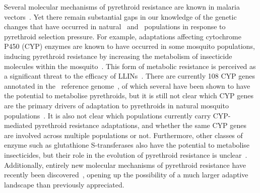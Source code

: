\begin{refsection}
Several molecular mechanisms of pyrethroid resistance are known in malaria vectors~\parencite{Hemingway2016}.
%
Yet there remain substantial gaps in our knowledge of the genetic changes that have occurred in natural \agam\ and \acol\ populations in response to pyrethroid selection pressure.
%
For example, adaptations affecting cytochrome P450 (CYP) enzymes are known to have occurred in some mosquito populations, inducing pyrethroid resistance by increasing the metabolism of insecticide molecules within the mosquito~\parencite{Ranson2016,Hemingway2016}.
%
This form of metabolic resistance is perceived as a significant threat to the efficacy of LLINs~\parencite{Churcher2016,WHO2017PBOLLIN}.
%
There are currently 108 CYP genes annotated in the \agam\ reference genome~\parencite{GiraldoCalderon2015,AgamP4.12}, of which several have been shown to have the potential to metabolise pyrethroids, but it is still not clear which CYP genes are the primary drivers of adaptation to pyrethroids in natural mosquito populations~\parencite{Mohammed2017}.
%
It is also not clear which populations currently carry CYP-mediated pyrethroid resistance adaptations, and whether the same CYP genes are involved across multiple populations or not.
%
Furthermore, other classes of enzyme such as glutathione S-transferases also have the potential to metabolise insecticides, but their role in the evolution of pyrethroid resistance is unclear~\parencite{Adolfi2019}.
%
Additionally, entirely new molecular mechanisms of pyrethroid resistance have recently been discovered~\parencite{Ingham2020}, opening up the possibility of a much larger adaptive landscape than previously appreciated.



\end{refsection}
